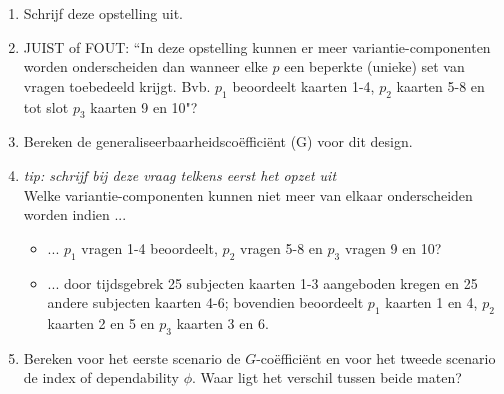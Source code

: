 {\begin{enumerate}
\begin{enumerate}
	\item Schrijf deze opstelling uit.
	\item JUIST of FOUT: ``In deze opstelling kunnen er meer variantie-componenten worden onderscheiden dan wanneer elke $p$ een beperkte (unieke) set van vragen toebedeeld krijgt. Bvb. $p_1$ beoordeelt kaarten 1-4, $p_2$ kaarten 5-8 en tot slot $p_3$ kaarten 9 en 10"?
	\item Bereken de generaliseerbaarheidsco\"{e}ffici\"{e}nt (G) voor dit design.
	\item \emph{tip: schrijf bij deze vraag telkens eerst het opzet uit}\\
	Welke variantie-componenten kunnen niet meer van elkaar onderscheiden worden indien ...
\begin{itemize}
	\item ... $p_1$ vragen 1-4 beoordeelt, $p_2$ vragen 5-8 en $p_3$ vragen 9 en 10?
	\item ... door tijdsgebrek 25 subjecten kaarten 1-3 aangeboden kregen en 25 andere subjecten kaarten 4-6; bovendien beoordeelt $p_1$ kaarten 1 en 4, $p_2$ kaarten 2 en 5 en $p_3$ kaarten 3 en 6.
\end{itemize}
\item Bereken voor het eerste scenario de $G$-co\"{e}ffici\"{e}nt en voor het tweede scenario de index of dependability $\phi$. Waar ligt het verschil tussen beide maten?
\end{enumerate}
\end{enumerate}
}

